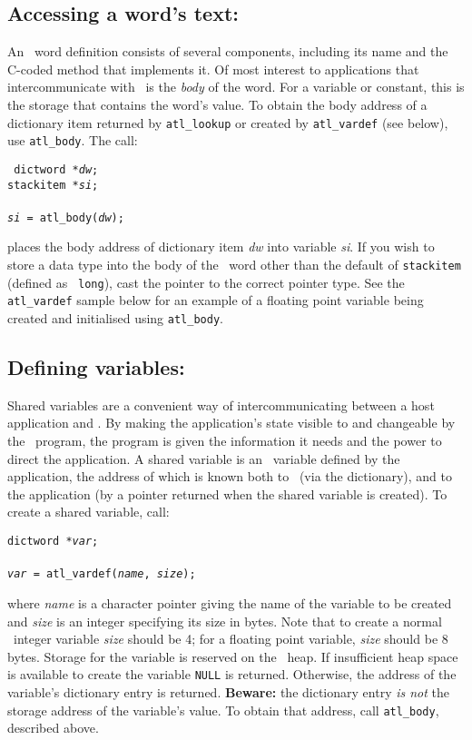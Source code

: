 \documentclass[twocolumn]{article}
\begin{document}
\subsection{Accessing a word's text: }

An \atlast\ word definition consists of several components, including
its name and the C-coded method that implements it.  Of most interest
to applications that intercommunicate with \atlast\ is the {\em body\/}
of the word.  For a variable or constant, this is the storage that
contains the word's value.  To obtain the body address of a
dictionary item returned by \verb+atl_lookup+ or created by
\verb+atl_vardef+ (see below), use \verb+atl_body+.  The call:

{\tt
dictword *{\em dw};\\
stackitem *{\em si};\\
\\
{\em si} = \verb+atl_body+({\em dw});}

places the body address of dictionary item {\em dw} into variable {\em
si}.  If you wish to store a data type into the body of the
\atlast\ word other than the default of {\tt stackitem} (defined as {\tt
long}), cast the pointer to the correct pointer type.  See the
\verb+atl_vardef+ sample below for an example of a floating point
variable being created and initialised using \verb+atl_body+.

\subsection{Defining variables: }

Shared variables are
a convenient way of intercommunicating between a host application
and \atlast .  By making the application's state
visible to and changeable by the \atlast\ program, the program is given the
information it needs and the power to direct the application.  A
shared variable is an \atlast\ variable defined by the application, the
address of which is known both to \atlast\ (via the dictionary), and to
the application (by a pointer returned when the shared variable is
created).  To create a shared variable, call:

{\tt dictword *{\em var};\\
\\
{\em var} = \verb+atl_vardef+({\em name}, {\em size});}

where {\em name} is a character pointer giving the name of the
variable to be created and {\em size} is an integer specifying its
size in bytes.  Note that to create a normal \atlast\ integer variable
{\em size} should be 4; for a floating point variable, {\em size}
should be 8 bytes.  Storage for the variable is reserved on the
\atlast\ heap.  If insufficient heap space is available to create the
variable {\tt NULL} is returned.  Otherwise, the address of the
variable's dictionary entry is returned.  {\bf Beware:} the dictionary
entry {\em is not} the storage address of the variable's value.
To obtain that address, call \verb+atl_body+, described above.
\end{document}
